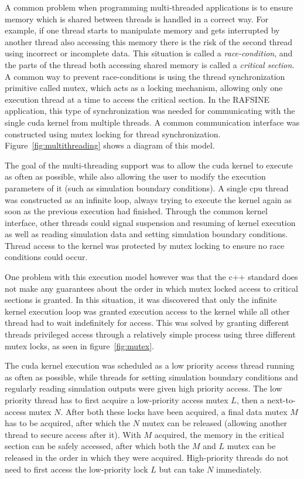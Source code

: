 A common problem when programming multi-threaded applications is to ensure memory which is shared between threads is handled in a correct way. For example, if one thread starts to manipulate memory and gets interrupted by another thread also accessing this memory there is the risk of the second thread using incorrect or incomplete data. This situation is called a \textit{race-condition}, and the parts of the thread both accessing shared memory is called a \textit{critical section}. A common way to prevent race-conditions is using the thread synchronization primitive called \gls{mutex}, which acts as a locking mechanism, allowing only one execution thread at a time to access the critical section. In the RAFSINE application, this type of synchronization was needed for communicating with the single \gls{cuda} kernel from multiple threads. A common communication interface was constructed using \gls{mutex} locking for thread synchronization. Figure~\ref{fig:multithreading} shows a diagram of this model.

The goal of the multi-threading support was to allow the \gls{cuda} kernel to execute as often as possible, while also allowing the user to modify the execution parameters of it (such as simulation boundary conditions). A single \gls{cpu} thread was constructed as an infinite loop, always trying to execute the kernel again as soon as the previous execution had finished. Through the common kernel interface, other threads could signal suspension and resuming of kernel execution as well as reading simulation data and setting simulation boundary conditions. Thread access to the kernel was protected by \gls{mutex} locking to ensure no race conditions could occur.

One problem with this execution model however was that the \gls{c++} standard does not make any guarantees about the order in which mutex locked access to critical sections is granted. In this situation, it was discovered that only the infinite kernel execution loop was granted execution access to the kernel while all other thread had to wait indefinitely for access. This was solved by granting different threads privileged access through a relatively simple process using three different mutex locks, as seen in figure~\ref{fig:mutex}.

The \gls{cuda} kernel execution was scheduled as a low priority access thread running as often as possible, while threads for setting simulation boundary conditions and regularly reading simulation outputs were given high priority access. The low priority thread has to first acquire a low-priority access mutex $L$, then a next-to-access mutex $N$. After both these locks have been acquired, a final data mutex $M$ has to be acquired, after which the $N$ mutex can be released (allowing another thread to secure access after it). With $M$ acquired, the memory in the critical section can be safely accessed, after which both the $M$ and $L$ mutex can be released in the order in which they were acquired. High-priority threads do not need to first access the low-priority lock $L$ but can take $N$ immediately.

